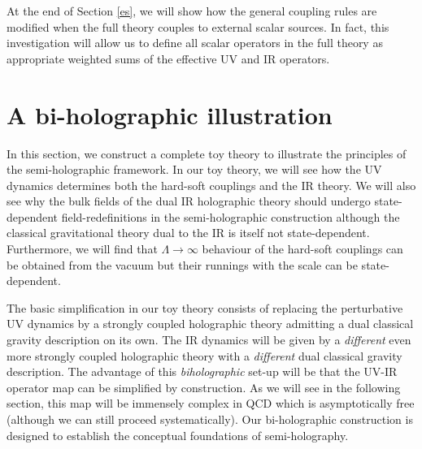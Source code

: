 \documentclass[prd,reprint,a4paper,showpacs,superscriptaddress,11pt,onecolumn,nofootinbib]{revtex4-1}
\renewcommand{\(}{\left(}
\renewcommand{\)}{\right)}
\newcommand{\6}{\partial}
\begin{document}
At the end of Section \ref{es}, we will show how the general coupling rules are modified when the full theory couples to external scalar sources. In fact, this investigation will allow us to define all scalar operators in the full theory as appropriate weighted sums of the effective UV and IR operators.

\section{A bi-holographic illustration}\label{sec:holRGapplication}

In this section, we construct a complete toy theory to illustrate the principles of the semi-holographic framework. In our toy theory, we will see how the UV dynamics determines both the hard-soft couplings and the IR theory. We will also see why the bulk fields of the dual IR holographic theory should undergo state-dependent field-redefinitions in the semi-holographic construction although the classical gravitational theory dual to the IR is itself not state-dependent. Furthermore, we will find that $\Lambda\rightarrow\infty$ behaviour of the hard-soft couplings can be obtained from the vacuum but their runnings with the scale can be state-dependent.

The basic simplification in our toy theory consists of replacing the perturbative UV dynamics by a strongly coupled holographic theory admitting a dual classical gravity description on its own. The IR dynamics will be given by a \textit{different} even more strongly coupled holographic theory with a \textit{different} dual classical gravity description. The advantage of this \textit{biholographic} set-up will be that the UV-IR operator map can be simplified by construction. As we will see in the following section, this map will be immensely complex in QCD which is asymptotically free (although we can still proceed systematically). Our bi-holographic construction is designed to establish the conceptual foundations of semi-holography.
\end{document}
